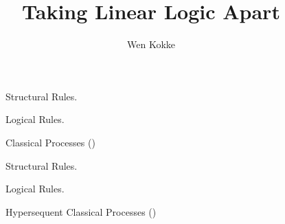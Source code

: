 \documentclass[submission,copyright,creativecommons]{eptcs}
\title{Taking Linear Logic Apart}
\author{%
  Wen Kokke
  \institute{University of Edinburgh\\ Edinburgh, Scotland}
  \email{wen.kokke@ed.ac.uk}}
\begin{document}
\maketitle

\begin{abstract}
\end{abstract}


\begin{figure*}[!htb]
  Structural Rules.
  \begin{center} \cpInfAx     \cpInfCut      \end{center}

  Logical Rules.
  \begin{center} \cpInfTens   \cpInfParr     \end{center}
  \begin{center} \cpInfOne    \cpInfBot      \end{center}
  \begin{center}       \end{center}
  \begin{center} \cpInfWith                  \end{center}
  \begin{center} \cpInfNil    \cpInfTop      \end{center}

  \caption{Classical Processes (\cp)}
  \label{fig:cp}
\end{figure*}

\begin{figure*}[!htb]
  Structural Rules.
  \begin{center} \hcpInfAx     \hcpInfCut    \end{center}
  \begin{center} \hcpInfMix    \hcpInfHalt   \end{center}
  
  Logical Rules.
  \begin{center} \hcpInfTens   \hcpInfParr   \end{center}
  \begin{center} \hcpInfOne    \hcpInfBot    \end{center}
  \begin{center}     \end{center}
  \begin{center} \hcpInfWith                 \end{center}
  \begin{center} \hcpInfNil    \hcpInfTop    \end{center} 
  
  \caption{Hypersequent Classical Processes (\hcp)}
  \label{fig:hcp}
\end{figure*}
\end{document}
